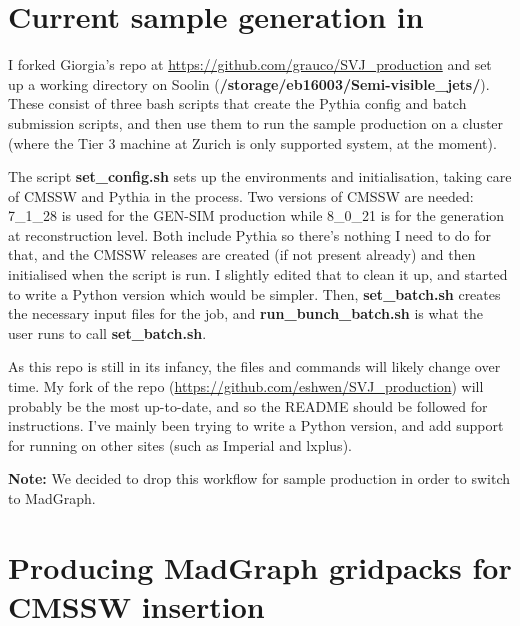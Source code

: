 

\section{Current sample generation in \PYTHIA}

I forked Giorgia's repo at \url{https://github.com/grauco/SVJ_production} and set up a working directory on Soolin (\textbf{/storage/eb16003/Semi-visible\_jets/}). These consist of three bash scripts that create the Pythia config and batch submission scripts, and then use them to run the sample production on a cluster (where the Tier 3 machine at Zurich is only supported system, at the moment).

The script \textbf{set\_config.sh} sets up the environments and initialisation, taking care of CMSSW and Pythia in the process. Two versions of CMSSW are needed: 7\_1\_28 is used for the GEN-SIM production while 8\_0\_21 is for the generation at reconstruction level. Both include Pythia so there's nothing I need to do for that, and the CMSSW releases are created (if not present already) and then initialised when the script is run. I slightly edited that to clean it up, and started to write a Python version which would be simpler. Then, \textbf{set\_batch.sh} creates the necessary input files for the job, and \textbf{run\_bunch\_batch.sh} is what the user runs to call \textbf{set\_batch.sh}.

As this repo is still in its infancy, the files and commands will likely change over time. My fork of the repo (\url{https://github.com/eshwen/SVJ_production}) will probably be the most up-to-date, and so the README should be followed for instructions. I've mainly been trying to write a Python version, and add support for running on other sites (such as Imperial and lxplus).

\textbf{Note:} We decided to drop this workflow for sample production in order to switch to MadGraph.


\section{Producing MadGraph gridpacks for CMSSW insertion}

